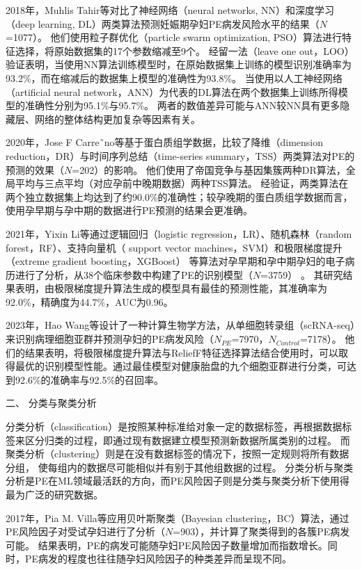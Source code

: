 2018年，Muhlis Tahir等\cite{Tahir2018,Tahir2018-2}对比了神经网络（neural networks, NN）和深度学习（deep learning, DL）两类算法预测妊娠期孕妇PE病发风险水平的结果（$N$=1077）。
他们使用粒子群优化（particle swarm optimization, PSO）算法进行特征选择，将原始数据集的17个参数缩减至9个。
经留一法（leave one out，LOO）验证表明，当使用NN算法训练模型时，在原始数据集上训练的模型识别准确率为93.2\%，而在缩减后的数据集上模型的准确性为93.8\%。
当使用以人工神经网络（artificial neural network，ANN）为代表的DL算法在两个数据集上训练所得模型的准确性分别为95.1\%与95.7\%。
两者的数值差异可能与ANN较NN具有更多隐藏层、网络的整体结构更加复杂等因素有关。

2020年，Jose F Carre˜no等\cite{Carreno2020}基于蛋白质组学数据，比较了降维（dimension reduction，DR）与时间序列总结（time-series summary，TSS）两类算法对PE的预测的效果（$N$=202）的影响。
他们使用了帝国竞争与基因集簇两种DR算法，全局平均与三点平均（对应孕前中晚期数据）两种TSS算法。
经验证，两类算法在两个独立数据集上均达到了约90.0\%的准确性；较孕晚期的蛋白质组学数据而言，使用孕早期与孕中期的数据进行PE预测的结果会更准确。

2021年，Yixin Li等\cite{LI2021102}通过逻辑回归（logistic regression，LR）、随机森林（random forest，RF）、支持向量机（ support vector machines，SVM）和极限梯度提升（extreme gradient boosting，XGBoost）
等算法对孕早期和孕中期孕妇的电子病历进行了分析，从38个临床参数中构建了PE的识别模型（$N$=3759） 。
其研究结果表明，由极限梯度提升算法生成的模型具有最佳的预测性能，其准确率为92.0\%，精确度为44.7\%，AUC为0.96。

2023年，Hao Wang等\cite{HW2023}设计了一种计算生物学方法，从单细胞转录组（scRNA-seq）来识别病理细胞亚群并预测孕妇的PE病发风险（$N_{PE}$=7970，$N_{Control}$=7178）。
他们的结果表明，将极限梯度提升算法与ReliefF特征选择算法结合使用时，可以取得最优的识别模型性能。通过最佳模型对健康胎盘的九个细胞亚群进行分类，可达到92.6\%的准确率与92.5\%的召回率。

二、 分类与聚类分析

分类分析（classification）是按照某种标准给对象一定的数据标签，再根据数据标签来区分归类的过程，即通过现有数据建立模型预测新数据所属类别的过程。
而聚类分析（clustering）则是在没有数据标签的情况下，按照一定规则将所有数据分组，
使每组内的数据尽可能相似并有别于其他组数据的过程\cite{Han2006}。
分类分析与聚类分析是PE在ML领域最活跃的方向，而PE风险因子则是分类与聚类分析下使用得最为广泛的研究数据。

2017年，Pia M. Villa等\cite{Villa2017}应用贝叶斯聚类（Bayesian clustering，BC）算法，通过PE风险因子对受试孕妇进行了分析（$N$=903），并计算了聚类得到的各簇PE病发可能。
结果表明，PE的病发可能随孕妇PE风险因子数量增加而指数增长。同时，PE病发的程度也往往随孕妇风险因子的种类差异而呈现不同。

